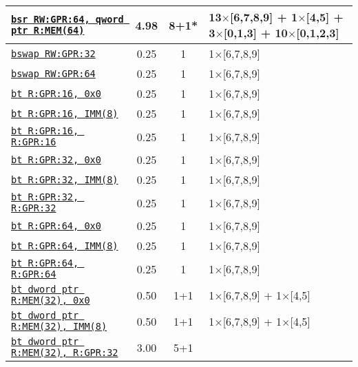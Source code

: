 \documentclass[a4paper,english,fontsize=9]{scrartcl}
\begin{document}
\begin{longtable}{p{}ccL{.25\textwidth}}
  \midrule
  \texttt{\href{https://felixcloutier.com/x86/BSR.html}{bsr RW:GPR:64, qword ptr R:MEM(64)}} & 4.98 & 8+1* & 13\(\times\)[6,7,8,9] + 1\(\times\)[4,5] + 3\(\times\)[0,1,3] + 10\(\times\)[0,1,2,3] \\
  \midrule
  \texttt{\href{https://felixcloutier.com/x86/BSWAP.html}{bswap RW:GPR:32}} & 0.25 & 1 & 1\(\times\)[6,7,8,9] \\
  \midrule
  \texttt{\href{https://felixcloutier.com/x86/BSWAP.html}{bswap RW:GPR:64}} & 0.25 & 1 & 1\(\times\)[6,7,8,9] \\
  \midrule
  \texttt{\href{https://felixcloutier.com/x86/BT.html}{bt R:GPR:16, 0x0}} & 0.25 & 1 & 1\(\times\)[6,7,8,9] \\
  \midrule
  \texttt{\href{https://felixcloutier.com/x86/BT.html}{bt R:GPR:16, IMM(8)}} & 0.25 & 1 & 1\(\times\)[6,7,8,9] \\
  \midrule
  \texttt{\href{https://felixcloutier.com/x86/BT.html}{bt R:GPR:16, R:GPR:16}} & 0.25 & 1 & 1\(\times\)[6,7,8,9] \\
  \midrule
  \texttt{\href{https://felixcloutier.com/x86/BT.html}{bt R:GPR:32, 0x0}} & 0.25 & 1 & 1\(\times\)[6,7,8,9] \\
  \midrule
  \texttt{\href{https://felixcloutier.com/x86/BT.html}{bt R:GPR:32, IMM(8)}} & 0.25 & 1 & 1\(\times\)[6,7,8,9] \\
  \midrule
  \texttt{\href{https://felixcloutier.com/x86/BT.html}{bt R:GPR:32, R:GPR:32}} & 0.25 & 1 & 1\(\times\)[6,7,8,9] \\
  \midrule
  \texttt{\href{https://felixcloutier.com/x86/BT.html}{bt R:GPR:64, 0x0}} & 0.25 & 1 & 1\(\times\)[6,7,8,9] \\
  \midrule
  \texttt{\href{https://felixcloutier.com/x86/BT.html}{bt R:GPR:64, IMM(8)}} & 0.25 & 1 & 1\(\times\)[6,7,8,9] \\
  \midrule
  \texttt{\href{https://felixcloutier.com/x86/BT.html}{bt R:GPR:64, R:GPR:64}} & 0.25 & 1 & 1\(\times\)[6,7,8,9] \\
  \midrule
  \texttt{\href{https://felixcloutier.com/x86/BT.html}{bt dword ptr R:MEM(32), 0x0}} & 0.50 & 1+1 & 1\(\times\)[6,7,8,9] + 1\(\times\)[4,5] \\
  \midrule
  \texttt{\href{https://felixcloutier.com/x86/BT.html}{bt dword ptr R:MEM(32), IMM(8)}} & 0.50 & 1+1 & 1\(\times\)[6,7,8,9] + 1\(\times\)[4,5] \\
  \midrule
  \texttt{\href{https://felixcloutier.com/x86/BT.html}{bt dword ptr R:MEM(32), R:GPR:32}} & 3.00 & 5+1 &  \\

\end{longtable}
\end{document}
